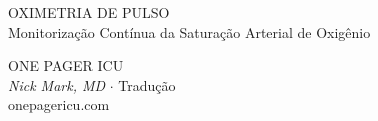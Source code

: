 \documentclass[10pt]{article}
\begin{document}
\noindent
{}

\noindent
\begin{minipage}[c][\dimexpr4.5cm\relax][c]{\textwidth}
    \hspace{2cm}%
    \begin{minipage}[c]{0.6\textwidth}
        {\titlefont\fontsize{42}{48}\selectfont\color{white}\MakeUppercase{Oximetria de Pulso}}\\[6pt]
        {\headerfont\large\color{slate200}Monitorização Contínua da Saturação Arterial de Oxigênio}
    \end{minipage}\hfill
    \begin{minipage}[c]{0.3\textwidth}
        \begin{flushright}
            {\headerfont\color{amber}\Large ONE PAGER ICU}\\[3pt]
            {\small\color{slate200}\textit{Nick Mark, MD} $\cdot$ Tradução}\\[2pt]
            {\footnotesize\color{slate700}onepagericu.com}
        \end{flushright}
    \end{minipage}%
    \hspace{2cm}
\end{minipage}

\vspace{0.6cm}
\end{document}
